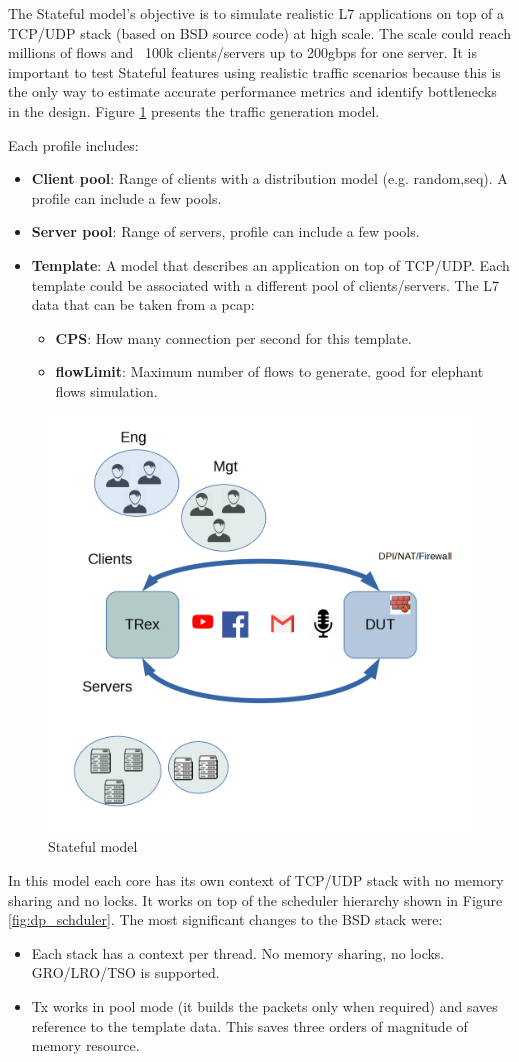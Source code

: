 \documentclass[conference]{IEEEtran}
\begin{document}
The Stateful model's objective is to simulate realistic L7 applications on top of a TCP/UDP stack (based on BSD source code) at high scale.
The scale could reach millions of flows and ~100k clients/servers up to 200gbps for one server. 
It is important to test Stateful features using realistic traffic scenarios because this is the only way to estimate accurate performance metrics and identify bottlenecks in the design. 
Figure \ref{fig:astf} presents the traffic generation model. 

Each profile includes:
\begin{itemize}
  \item \textbf{Client pool}: Range of clients with a distribution model (e.g. random,seq). A profile can include a few pools.
  \item \textbf{Server pool}: Range of servers, profile can include a few pools. 
  \item \textbf{Template}: A model that describes an application on top of TCP/UDP. Each template could be associated with a different pool of clients/servers. The L7 data that can be taken from a pcap:
  \begin{itemize}
  \item \textbf{CPS}: How many connection per second for this template. 
  \item \textbf{flowLimit}: Maximum number of flows to generate. good for elephant flows simulation.
  \end{itemize}
\end{itemize}

\begin{figure}[h]
  \includegraphics[width=0.3
  \textwidth, center]{stateful_model.png}
  \caption{Stateful model}
  \label{fig:astf}
\end{figure}

In this model each core has its own context of TCP/UDP stack with no memory sharing and no locks. It works on top of the scheduler hierarchy shown in Figure \ref{fig:dp_schduler}.
The most significant changes to the BSD stack were:
\begin{itemize}
  \item Each stack has a context per thread. No memory sharing, no locks. GRO/LRO/TSO is supported. 
  \item Tx works in pool mode (it builds the packets only when required) and saves reference to the template data. This saves three orders of magnitude of memory resource.
\end{itemize}
\end{document}

